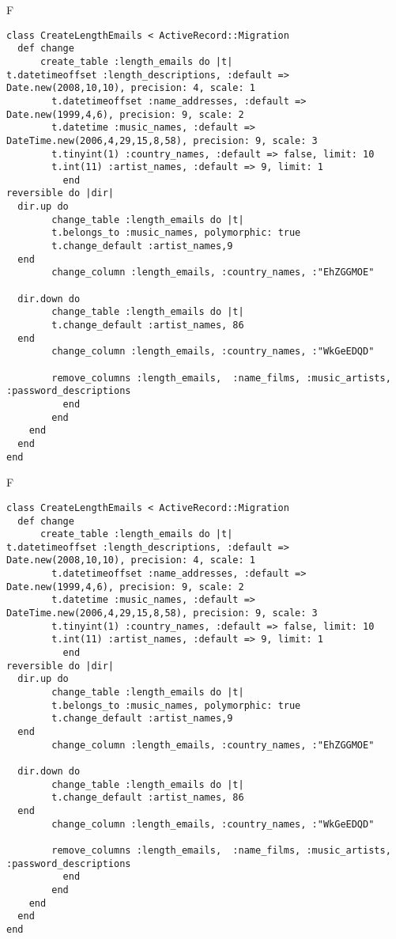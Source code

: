 F
\begin{verbatim}
class CreateLengthEmails < ActiveRecord::Migration
  def change
	  create_table :length_emails do |t|
t.datetimeoffset :length_descriptions, :default => Date.new(2008,10,10), precision: 4, scale: 1
		t.datetimeoffset :name_addresses, :default => Date.new(1999,4,6), precision: 9, scale: 2
		t.datetime :music_names, :default => DateTime.new(2006,4,29,15,8,58), precision: 9, scale: 3
		t.tinyint(1) :country_names, :default => false, limit: 10
		t.int(11) :artist_names, :default => 9, limit: 1
		  end
reversible do |dir|
  dir.up do
		change_table :length_emails do |t|
		t.belongs_to :music_names, polymorphic: true
 		t.change_default :artist_names,9
  end
 		change_column :length_emails, :country_names, :"EhZGGMOE"
   
  dir.down do
		change_table :length_emails do |t|
		t.change_default :artist_names, 86
  end
 		change_column :length_emails, :country_names, :"WkGeEDQD"
   
		remove_columns :length_emails,  :name_films, :music_artists, :password_descriptions 
	      end
	    end
    end 
  end
end

\end{verbatim}

F
\begin{verbatim}
class CreateLengthEmails < ActiveRecord::Migration
  def change
	  create_table :length_emails do |t|
t.datetimeoffset :length_descriptions, :default => Date.new(2008,10,10), precision: 4, scale: 1
		t.datetimeoffset :name_addresses, :default => Date.new(1999,4,6), precision: 9, scale: 2
		t.datetime :music_names, :default => DateTime.new(2006,4,29,15,8,58), precision: 9, scale: 3
		t.tinyint(1) :country_names, :default => false, limit: 10
		t.int(11) :artist_names, :default => 9, limit: 1
		  end
reversible do |dir|
  dir.up do
		change_table :length_emails do |t|
		t.belongs_to :music_names, polymorphic: true
 		t.change_default :artist_names,9
  end
 		change_column :length_emails, :country_names, :"EhZGGMOE"
   
  dir.down do
		change_table :length_emails do |t|
		t.change_default :artist_names, 86
  end
 		change_column :length_emails, :country_names, :"WkGeEDQD"
   
		remove_columns :length_emails,  :name_films, :music_artists, :password_descriptions 
	      end
	    end
    end 
  end
end

\end{verbatim}

